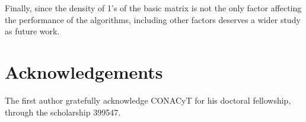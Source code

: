 \documentclass[number,preprint,review,12pt]{elsarticle}
\begin{document}
	Finally, since the density of 1's of the basic matrix is not the only factor affecting the performance of the algorithms, including other factors deserves a wider study as future work. 

\section{Acknowledgements}
	The first author gratefully acknowledge CONACyT for his doctoral fellowship, through the scholarship 399547.
\newpage 
{}

\end{document}
